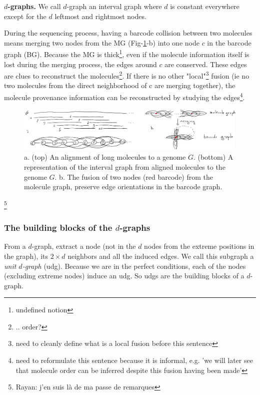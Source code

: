 \noindent \textbf{$d$-graphs.} We call $d$-graph an interval graph where $d$ is constant everywhere except for the $d$ leftmost and rightmost nodes.

During the sequencing process, having a barcode collision between two molecules means merging two nodes from the MG (Fig-\ref{fig:fusion}-b) into one node $c$ in the barcode graph (BG).
Because the MG is thick\footnote{undefined notion}, even if the molecule information itself is lost during the merging process, the edges around $c$ are conserved.
These edges are clues to reconstruct the molecules\footnote{.. order?}.
If there is no other "local"\footnote{need to cleanly define what is a local fusion before this sentence} fusion (ie no two molecules from the direct neighborhood of c are merging together), the molecule provenance information can be reconstructed by studying the edges\footnote{need to reformulate this sentence because it is informal, e.g. 'we will later see that molecule order can be inferred despite this fusion having been made'}.

\begin{figure}[htp]
    \centering
    \includegraphics[width=\textwidth]{fusion.pdf}
    \caption{ a. (top) An alignment of long molecules to a genome $G$. (bottom) A representation of the interval graph from aligned molecules to the genome $G$. b. The fusion of two nodes (red barcode) from the molecule graph, preserve edge orientations in the barcode graph. }
    \label{fig:fusion}
\end{figure}

\footnote{Rayan: j'en suis là de ma passe de remarques}

\subsubsection*{The building blocks of the $d$-graphs}

From a $d$-graph, extract a node (not in the $d$ nodes from the extreme positions in the graph), its $2\times d$ neighbors and all the induced edges.
We call this subgraph a \textit{unit $d$-graph} (udg).
Because we are in the perfect conditions, each of the nodes (excluding extreme nodes) induce an udg.
So udgs are the building blocks of a $d$-graph.

